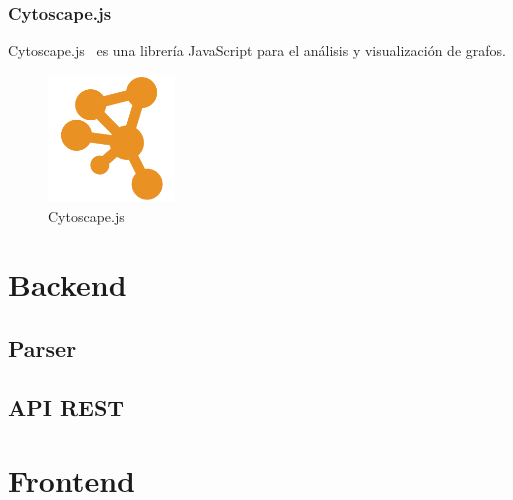 \subsubsection*{Cytoscape.js}

Cytoscape.js~\cite{cytoscape} es una librería JavaScript para el análisis y visualización de grafos.

\begin{figure}[tbh]
\centering
\label{fig:cytoscape}
\includegraphics[width=0.3\textwidth]{imagenes/cytoscape}
\caption{Cytoscape.js}
\end{figure}

\section{Backend}

\subsection*{Parser}

\subsection*{API REST}

\section{Frontend}